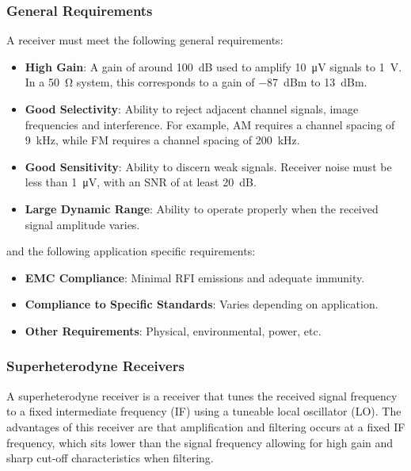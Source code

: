 \documentclass{article}
\begin{document}
\subsubsection{General Requirements}
A receiver must meet the following general requirements:
\begin{itemize}
    \item \textbf{High Gain}: A gain of around \qty{100}{dB} used to amplify \qty{10}{\micro V} signals to \qty{1}{V}.
          In a \qty{50}{\ohm} system, this corresponds to a gain of \qty{-87}{dBm} to \qty{13}{dBm}.
    \item \textbf{Good Selectivity}: Ability to reject adjacent channel signals, image frequencies and interference.
          For example, AM requires a channel spacing of \qty{9}{kHz}, while FM requires a channel spacing of \qty{200}{kHz}.
    \item \textbf{Good Sensitivity}: Ability to discern weak signals. Receiver noise must be less than \qty{1}{\micro V}, with an SNR of at least \qty{20}{dB}.
    \item \textbf{Large Dynamic Range}: Ability to operate properly when the received signal amplitude varies.
\end{itemize}
and the following application specific requirements:
\begin{itemize}
    \item \textbf{EMC Compliance}: Minimal RFI emissions and adequate immunity.
    \item \textbf{Compliance to Specific Standards}: Varies depending on application.
    \item \textbf{Other Requirements}: Physical, environmental, power, etc.
\end{itemize}
\subsubsection{Superheterodyne Receivers}
A superheterodyne receiver is a receiver that tunes the received signal
frequency to a fixed intermediate frequency (IF) using a tuneable local
oscillator (LO). The advantages of this receiver are that amplification
and filtering occurs at a fixed IF frequency, which sits lower than the
signal frequency allowing for high gain and sharp cut-off
characteristics when filtering.
\end{document}
